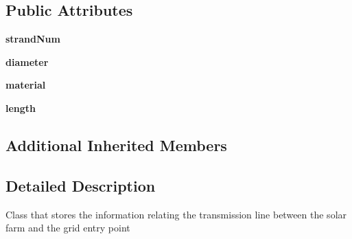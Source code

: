 \subsection*{Public Attributes}
\begin{DoxyCompactItemize}
\item 
\hypertarget{class_solar_calculator_1_1_assets_1_1_a_c2_cable_a85ac5056d5cd4a39aa6fb72aa41f80a8}{{\bfseries strand\-Num}}\label{class_solar_calculator_1_1_assets_1_1_a_c2_cable_a85ac5056d5cd4a39aa6fb72aa41f80a8}

\item 
\hypertarget{class_solar_calculator_1_1_assets_1_1_a_c2_cable_ab9c0d5757894e92e4751e01cae90078c}{{\bfseries diameter}}\label{class_solar_calculator_1_1_assets_1_1_a_c2_cable_ab9c0d5757894e92e4751e01cae90078c}

\item 
\hypertarget{class_solar_calculator_1_1_assets_1_1_a_c2_cable_a8e69bb6b88e943fb73a736706e8e3a94}{{\bfseries material}}\label{class_solar_calculator_1_1_assets_1_1_a_c2_cable_a8e69bb6b88e943fb73a736706e8e3a94}

\item 
\hypertarget{class_solar_calculator_1_1_assets_1_1_a_c2_cable_a1e193854c690dfe5175c905cb52ca64f}{{\bfseries length}}\label{class_solar_calculator_1_1_assets_1_1_a_c2_cable_a1e193854c690dfe5175c905cb52ca64f}

\end{DoxyCompactItemize}
\subsection*{Additional Inherited Members}


\subsection{Detailed Description}
\begin{DoxyVerb}Class that stores the information relating the transmission line between the solar farm and
the grid entry point \end{DoxyVerb}
 


